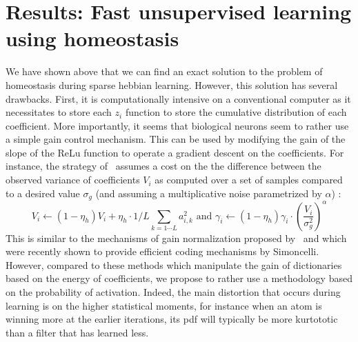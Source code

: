 \documentclass[a4paper, 11pt, draft]{article} %
\begin{document}
\section{Results: Fast unsupervised learning using homeostasis}\label{results}
We have shown above that we can find an exact solution to the problem of homeostasis during sparse hebbian learning. However, this solution has several drawbacks. First, it is computationally intensive on a conventional computer as it necessitates to store each $z_i$ function to store the cumulative distribution of each coefficient. More importantly, it seems that biological neurons seem to rather use a simple gain control mechanism. This can be used by modifying the gain of the slope of the ReLu function to operate a gradient descent on the coefficients. For instance, the strategy of~\citep{Olshausen97} assumes a cost on the the difference between the observed variance of coefficients $V_i$ as computed over a set of samples compared to a desired value $\sigma_g$ (and assuming a multiplicative noise parametrized by $\alpha$) :
\begin{equation}%
V_i \leftarrow (1- \eta_h ) V_i + \eta_h \cdot 1/L\sum_{k=1\cdots L} a_{i, k}^2 \textrm{ and }
\gamma_i \leftarrow (1- \eta_h ) \gamma_i \cdot \left( \frac{V_i}{\sigma_g^2} \right)^\alpha
\end{equation}%
This is similar to the mechanisms of gain normalization proposed by~\citep{Schwartz01} and which were recently shown to provide efficient coding mechanisms by Simoncelli. However, compared to these methods which manipulate the gain of dictionaries based on the energy of coefficients, we propose to rather use a methodology based on the probability of activation. Indeed, the main distortion that occurs during learning is on the higher statistical moments, for instance when an atom is winning more at the earlier iterations, its pdf will typically be more kurtototic than a filter that has learned less.
\end{document}
